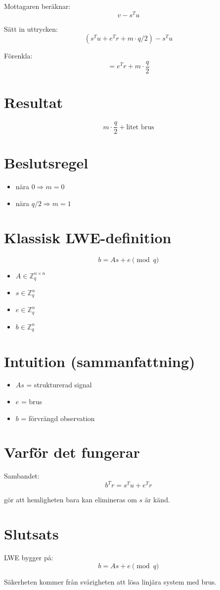 \documentclass{article}
\begin{document}
Mottagaren beräknar:
\[
v - s^T u
\]

Sätt in uttrycken:
\[
(s^T u + e^T r + m \cdot q/2) - s^T u
\]

Förenkla:
\[
= e^T r + m \cdot \frac{q}{2}
\]

\section{Resultat}

\[
m \cdot \frac{q}{2} + \text{litet brus}
\]

\section{Beslutsregel}

\begin{itemize}
\item nära $0 \Rightarrow m = 0$
\item nära $q/2 \Rightarrow m = 1$
\end{itemize}

\section{Klassisk LWE-definition}

\[
b = As + e \pmod q
\]

\begin{itemize}
\item $A \in \mathbb{Z}_q^{n \times n}$
\item $s \in \mathbb{Z}_q^n$
\item $e \in \mathbb{Z}_q^n$
\item $b \in \mathbb{Z}_q^n$
\end{itemize}

\section{Intuition (sammanfattning)}

\begin{itemize}
\item $As$ = strukturerad signal
\item $e$ = brus
\item $b$ = förvrängd observation
\end{itemize}

\section{Varför det fungerar}

Sambandet:
\[
b^T r = s^T u + e^T r
\]

gör att hemligheten bara kan elimineras om $s$ är känd.

\section{Slutsats}

LWE bygger på:
\[
b = As + e \pmod q
\]

Säkerheten kommer från svårigheten att lösa linjära system med brus.
\end{document}
